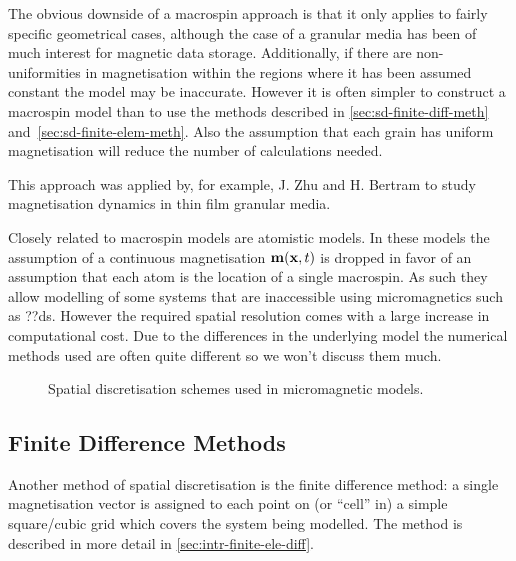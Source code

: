 The obvious downside of a macrospin approach is that it only applies to fairly specific geometrical cases, although the case of a granular media has been of much interest for magnetic data storage. Additionally, if there are non-uniformities in magnetisation within the regions where it has been assumed constant the model may be inaccurate. However it is often simpler to construct a macrospin model than to use the methods described in \autoref{sec:sd-finite-diff-meth} and~\ref{sec:sd-finite-elem-meth}. Also the assumption that each grain has uniform magnetisation will reduce the number of calculations needed.

This approach was applied by, for example, J. Zhu and H. Bertram to study magnetisation dynamics in thin film granular media.\cite{Zhu1988}

Closely related to macrospin models are atomistic models\cite{Evans2014}.
In these models the assumption of a continuous magnetisation $\mathbf{m}(\mathbf{x}, t)$ is dropped in favor of an assumption that each atom is the location of a single macrospin.
As such they allow modelling of some systems that are inaccessible using micromagnetics such as ??ds.
However the required spatial resolution comes with a large increase in computational cost.
Due to the differences in the underlying model the numerical methods used are often quite different so we won't discuss them much.

\begin{figure}[h]
  \centering
  \caption{Spatial discretisation schemes used in micromagnetic models.}
  \label{fig:types-spat-discl}
\end{figure}


\subsection{Finite Difference Methods}
\label{sec:sd-finite-diff-meth}

Another method of spatial discretisation is the finite difference method: a single magnetisation vector is assigned to each point on (or ``cell'' in) a simple square/cubic grid which covers the system being modelled. The method is described in more detail in \autoref{sec:intr-finite-ele-diff}.

